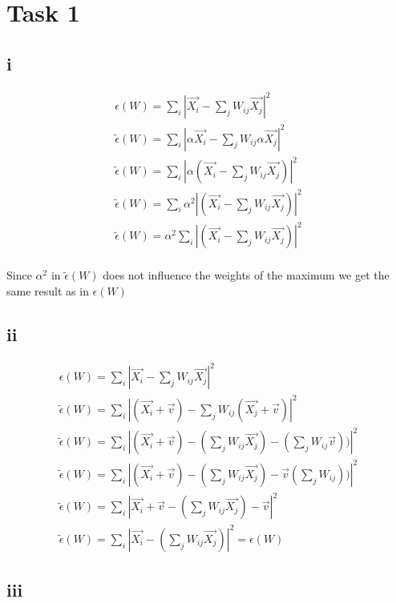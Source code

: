 \section*{Task 1}

\subsection*{i}

\begin{gather*}
\epsilon(W) = \sum_{i} |\vec{X_{i}} - \sum_j W_{ij} \vec{X_{j}}| ^{2} \\
\tilde{\epsilon}(W) = \sum_{i} |\alpha \vec{X_{i}} - \sum_j W_{ij} \alpha \vec{X_{j}}| ^{2} \\
\tilde{\epsilon}(W) = \sum_{i} |\alpha (\vec{X_{i}} - \sum_j W_{ij} \vec{X_{j}})| ^{2} \\
\tilde{\epsilon}(W) = \sum_{i} \alpha^2 |(\vec{X_{i}} - \sum_j W_{ij} \vec{X_{j}})| ^{2} \\
\tilde{\epsilon}(W) = \alpha^2 \sum_{i} |(\vec{X_{i}} - \sum_j W_{ij} \vec{X_{j}})| ^{2} \\
\end{gather*}

Since $\alpha^2$ in $\tilde{\epsilon}(W)$ does not influence the weights of the maximum we get the same result as in ${\epsilon}(W)$

\subsection*{ii}

\begin{gather*}
\epsilon(W) = \sum_{i} |\vec{X_{i}} - \sum_j W_{ij} \vec{X_{j}}| ^{2} \\
\tilde{\epsilon}(W) = \sum_{i} |(\vec{X_{i}} + \vec{v}) - \sum_j W_{ij}  (\vec{X_{j}} + \vec{v})| ^{2} \\
\tilde{\epsilon}(W) = \sum_{i} |(\vec{X_{i}} + \vec{v}) - (\sum_j W_{ij} \vec{X_{j}}) - (\sum_j W_{ij} \vec{v}))| ^{2} \\
\tilde{\epsilon}(W) = \sum_{i} |(\vec{X_{i}} + \vec{v}) - (\sum_j W_{ij} \vec{X_{j}}) - \vec{v} (\sum_j W_{ij}))| ^{2} \\
\tilde{\epsilon}(W) = \sum_{i} |\vec{X_{i}} + \vec{v} - (\sum_j W_{ij} \vec{X_{j}}) - \vec{v}| ^{2} \\
\tilde{\epsilon}(W) = \sum_{i} |\vec{X_{i}} - (\sum_j W_{ij} \vec{X_{j}})| ^{2} = \epsilon(W)
\end{gather*}

\subsection*{iii}

